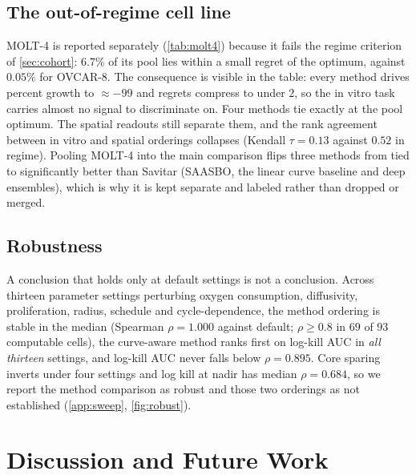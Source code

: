 \documentclass{article}
\begin{document}
\subsection{The out-of-regime cell line}
\label{sec:molt4}

MOLT-4 is reported separately (\cref{tab:molt4}) because it fails the regime
criterion of \cref{sec:cohort}: $6.7\%$ of its pool lies within a small
regret of the optimum, against $0.05\%$ for OVCAR-8. The consequence is visible in the table: every method drives percent growth to $\approx -99$ and regrets compress to under $2$, so the in vitro task carries almost no signal to discriminate on. Four methods tie exactly at the pool optimum.
The spatial readouts still separate them, and the rank agreement between
in vitro and spatial orderings collapses (Kendall $\tau = 0.13$ against
$0.52$ in regime). Pooling MOLT-4 into the main comparison flips three
methods from tied to significantly better than Savitar (SAASBO, the linear
curve baseline and deep ensembles), which is why it is kept separate and
labeled rather than dropped or merged.

\subsection{Robustness}
\label{sec:robust}

A conclusion that holds only at default settings is not a conclusion. Across
thirteen parameter settings perturbing oxygen consumption, diffusivity,
proliferation, radius, schedule and cycle-dependence, the method ordering is
stable in the median (Spearman $\rho = 1.000$ against default; $\rho \ge 0.8$
in $69$ of $93$ computable cells), the curve-aware method ranks first on
log-kill AUC in \emph{all thirteen} settings, and log-kill AUC never falls
below $\rho = 0.895$. Core sparing inverts under four settings and log kill
at nadir has median $\rho = 0.684$, so we report the method comparison as
robust and those two orderings as not established (\cref{app:sweep},
\cref{fig:robust}).

\section{Discussion and Future Work}
\label{sec:future}
\end{document}
